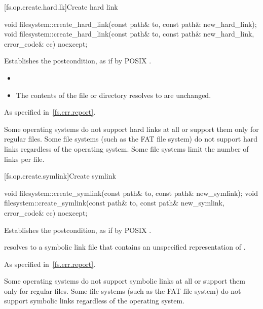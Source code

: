[fs.op.create.hard.lk]{Create hard link}

%
\begin{itemdecl}
void filesystem::create_hard_link(const path& to, const path& new_hard_link);
void filesystem::create_hard_link(const path& to, const path& new_hard_link,
                                  error_code& ec) noexcept;
\end{itemdecl}

\begin{itemdescr}
\pnum
\effects
Establishes the postcondition, as if by POSIX .

\pnum
\ensures
\begin{itemize}
\item {}
\item The contents of the file or directory
     resolves to are unchanged.
\end{itemize}

\pnum
\throws
As specified in~\ref{fs.err.report}.

\pnum
\begin{note}
Some operating systems do not support hard links at all or support
  them only for regular files. Some file systems (such as the FAT file system)
  do not support hard links regardless of the operating system.
  Some file systems limit the number of links per file.
\end{note}
\end{itemdescr}

[fs.op.create.symlink]{Create symlink}

%
\begin{itemdecl}
void filesystem::create_symlink(const path& to, const path& new_symlink);
void filesystem::create_symlink(const path& to, const path& new_symlink,
                                error_code& ec) noexcept;
\end{itemdecl}

\begin{itemdescr}
\pnum
\effects
Establishes the postcondition, as if by POSIX .

\pnum
\ensures
{} resolves to a symbolic link file that
  contains an unspecified representation of .

\pnum
\throws
As specified in~\ref{fs.err.report}.

\pnum
\begin{note}
Some operating systems do not support symbolic links at all or support
  them only for regular files.
  Some file systems (such as the FAT file system) do not
  support symbolic links regardless of the operating system.
\end{note}
\end{itemdescr}

